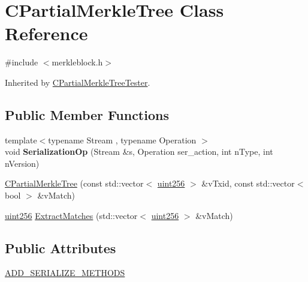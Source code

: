 \hypertarget{class_c_partial_merkle_tree}{}\section{C\+Partial\+Merkle\+Tree Class Reference}
\label{class_c_partial_merkle_tree}


{\ttfamily \#include $<$merkleblock.\+h$>$}



Inherited by \mbox{\hyperlink{class_c_partial_merkle_tree_tester}{C\+Partial\+Merkle\+Tree\+Tester}}.

\subsection*{Public Member Functions}
\begin{DoxyCompactItemize}
\item 
\mbox{\label{class_c_partial_merkle_tree_a44903b156e6c77f3ef977324b24daf1f}} 
{\footnotesize template$<$typename Stream , typename Operation $>$ }\\void {\bfseries Serialization\+Op} (Stream \&s, Operation ser\+\_\+action, int n\+Type, int n\+Version)
\item 
\mbox{\hyperlink{class_c_partial_merkle_tree_a0656767dc0d8f3d603c54e5be21d3890}{C\+Partial\+Merkle\+Tree}} (const std\+::vector$<$ \mbox{\hyperlink{classuint256}{uint256}} $>$ \&v\+Txid, const std\+::vector$<$ bool $>$ \&v\+Match)
\item 
\mbox{\hyperlink{classuint256}{uint256}} \mbox{\hyperlink{class_c_partial_merkle_tree_a28c3456d1159b33b6c2689ac88eb56ad}{Extract\+Matches}} (std\+::vector$<$ \mbox{\hyperlink{classuint256}{uint256}} $>$ \&v\+Match)
\end{DoxyCompactItemize}
\subsection*{Public Attributes}
\begin{DoxyCompactItemize}
\item 
\mbox{\hyperlink{class_c_partial_merkle_tree_ae218db8103edb6672fe0d642535c7490}{A\+D\+D\+\_\+\+S\+E\+R\+I\+A\+L\+I\+Z\+E\+\_\+\+M\+E\+T\+H\+O\+DS}}
\end{DoxyCompactItemize}
